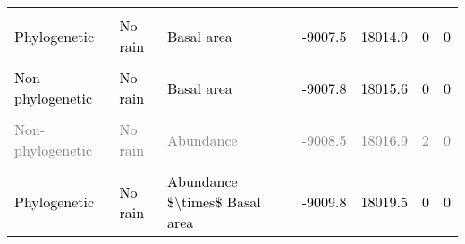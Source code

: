 \documentclass[
  12pt,
  letterpaper,
  DIV=11,
  numbers=noendperiod]{scrartcl}
\begin{document}
\begin{table}[H]
{\begin{tabular}[t]{lllllll}
\cellcolor{gray!6}{\textcolor{black}{Non-phylogenetic}} & \cellcolor{gray!6}{\textcolor{black}{Rain without interactions}} & \cellcolor{gray!6}{\textcolor{black}{Abundance + Basal area}} & \cellcolor{gray!6}{\textcolor{black}{-9007.2}} & \cellcolor{gray!6}{\textcolor{black}{18014.4}} & \cellcolor{gray!6}{\textcolor{black}{0}} & \cellcolor{gray!6}{\textcolor{black}{0}}\\
\addlinespace
\textcolor{black}{Phylogenetic} & \textcolor{black}{No rain} & \textcolor{black}{Basal area} & \textcolor{black}{-9007.5} & \textcolor{black}{18014.9} & \textcolor{black}{0} & \textcolor{black}{0}\\
\cellcolor{gray!6}{\textcolor{black}{Phylogenetic}} & \cellcolor{gray!6}{\textcolor{black}{Rain without interactions}} & \cellcolor{gray!6}{\textcolor{black}{Abundance + Basal area}} & \cellcolor{gray!6}{\textcolor{black}{-9007.5}} & \cellcolor{gray!6}{\textcolor{black}{18014.9}} & \cellcolor{gray!6}{\textcolor{black}{0}} & \cellcolor{gray!6}{\textcolor{black}{0}}\\
\textcolor{black}{Non-phylogenetic} & \textcolor{black}{No rain} & \textcolor{black}{Basal area} & \textcolor{black}{-9007.8} & \textcolor{black}{18015.6} & \textcolor{black}{0} & \textcolor{black}{0}\\
\cellcolor{gray!6}{\textcolor{black}{Phylogenetic}} & \cellcolor{gray!6}{\textcolor{black}{No rain}} & \cellcolor{gray!6}{\textcolor{black}{Abundance}} & \cellcolor{gray!6}{\textcolor{black}{-9007.9}} & \cellcolor{gray!6}{\textcolor{black}{18015.8}} & \cellcolor{gray!6}{\textcolor{black}{0}} & \cellcolor{gray!6}{\textcolor{black}{0}}\\
\textcolor{gray}{Non-phylogenetic} & \textcolor{gray}{No rain} & \textcolor{gray}{Abundance} & \textcolor{gray}{-9008.5} & \textcolor{gray}{18016.9} & \textcolor{gray}{2} & \textcolor{gray}{0}\\
\addlinespace
\cellcolor{gray!6}{\textcolor{black}{Non-phylogenetic}} & \cellcolor{gray!6}{\textcolor{black}{No rain}} & \cellcolor{gray!6}{\textcolor{black}{Abundance + Basal area}} & \cellcolor{gray!6}{\textcolor{black}{-9009.0}} & \cellcolor{gray!6}{\textcolor{black}{18017.9}} & \cellcolor{gray!6}{\textcolor{black}{0}} & \cellcolor{gray!6}{\textcolor{black}{0}}\\
\textcolor{black}{Phylogenetic} & \textcolor{black}{No rain} & \textcolor{black}{Abundance \$\textbackslash{}times\$ Basal area} & \textcolor{black}{-9009.8} & \textcolor{black}{18019.5} & \textcolor{black}{0} & \textcolor{black}{0}\\

\end{tabular}}
\end{table}
\end{document}
